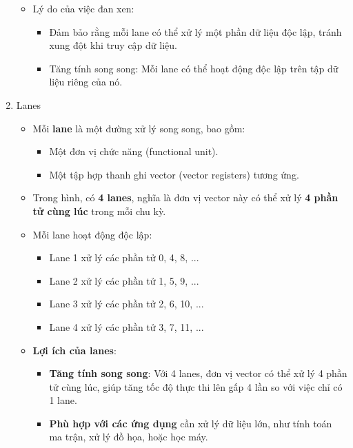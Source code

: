 \documentclass[a4paper]{article}
\begin{document}
\begin{enumerate}
\begin{itemize}
\begin{itemize}
        \end{itemize}
        \item Lý do của việc đan xen:
        \begin{itemize}
            \item Đảm bảo rằng mỗi lane có thể xử lý một phần dữ liệu độc lập, tránh xung đột khi truy cập dữ liệu.
            \item Tăng tính song song: Mỗi lane có thể hoạt động độc lập trên tập dữ liệu riêng của nó.
        \end{itemize}
    \end{itemize}
    \item Lanes
    \begin{itemize}
        \item Mỗi \textbf{lane} là một đường xử lý song song, bao gồm:
        \begin{itemize}
            \item Một đơn vị chức năng (functional unit).
            \item Một tập hợp thanh ghi vector (vector registers) tương ứng.
        \end{itemize}
        \item Trong hình, có \textbf{4 lanes}, nghĩa là đơn vị vector này có thể xử lý \textbf{4 phần tử cùng lúc} trong mỗi chu kỳ.
        \item Mỗi lane hoạt động độc lập:
        \begin{itemize}
            \item Lane 1 xử lý các phần tử 0, 4, 8, ...
            \item Lane 2 xử lý các phần tử 1, 5, 9, ...
            \item Lane 3 xử lý các phần tử 2, 6, 10, ...
            \item Lane 4 xử lý các phần tử 3, 7, 11, ...
        \end{itemize}
        \item \textbf{Lợi ích của lanes}:
        \begin{itemize}
            \item \textbf{Tăng tính song song}: Với 4 lanes, đơn vị vector có thể xử lý 4 phần tử cùng lúc, giúp tăng tốc độ thực thi lên gấp 4 lần so với việc chỉ có 1 lane.
            \item \textbf{Phù hợp với các ứng dụng} cần xử lý dữ liệu lớn, như tính toán ma trận, xử lý đồ họa, hoặc học máy.
        \end{itemize}
    \end{itemize}

\end{enumerate}
\end{document}
